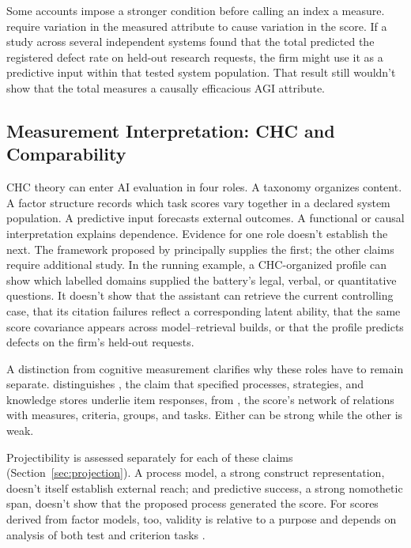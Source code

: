 \documentclass[12pt]{article}
\begin{document}
Some accounts impose a stronger condition before calling an index a measure. \Textcite{borsboom2004conceptValidity} require variation in the measured attribute to cause variation in the score. If a study across several independent systems found that the total predicted the registered defect rate on held-out research requests, the firm might use it as a predictive input within that tested system population. That result still wouldn't show that the total measures a causally efficacious AGI attribute.

\subsection{Measurement Interpretation: CHC and Comparability}\label{ssec:chc_scope}

CHC theory \citep{carroll1993human,mcgrew2009chc,schneider2018chc} can enter AI evaluation in four roles. A taxonomy organizes content. A factor structure records which task scores vary together in a declared system population. A predictive input forecasts external outcomes. A functional or causal interpretation explains dependence. Evidence for one role doesn't establish the next. The framework proposed by \textcite{hendrycks2025agi} principally supplies the first; the other claims require additional study. In the running example, a CHC-organized profile can show which labelled domains supplied the battery's legal, verbal, or quantitative questions. It doesn't show that the assistant can retrieve the current controlling case, that its citation failures reflect a corresponding latent ability, that the same score covariance appears across model--retrieval builds, or that the profile predicts defects on the firm's held-out requests.

A distinction from cognitive measurement clarifies why these roles have to remain separate. \Textcite[179--181, 195--196]{embretson1983construct} distinguishes , the claim that specified processes, strategies, and knowledge stores underlie item responses, from , the score's network of relations with measures, criteria, groups, and tasks. Either can be strong while the other is weak.

Projectibility is assessed separately for each of these claims (Section~\ref{sec:projection}). A process model, a strong construct representation, doesn't itself establish external reach; and predictive success, a strong nomothetic span, doesn't show that the proposed process generated the score. For scores derived from factor models, too, validity is relative to a purpose and depends on analysis of both test and criterion tasks \citep[693]{carroll1993human}.
\end{document}
